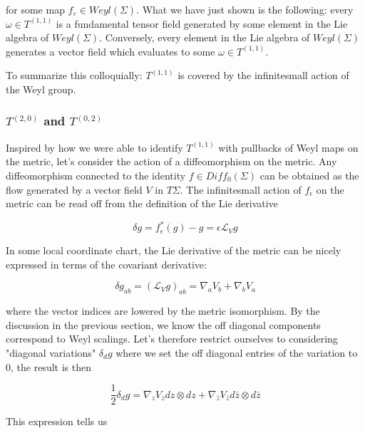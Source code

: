    for some map $f_\varepsilon \in Weyl(\Sigma)$. What we have just shown is the following: every $\omega \in T^{(1, 1)}$ is a fundamental tensor field generated by some element in the Lie algebra of $Weyl(\Sigma)$. Conversely, every element in the Lie algebra of $Weyl(\Sigma)$ generates a vector field which evaluates to some $\omega \in T^{(1, 1)}$.

    To summarize this colloquially: $T^{(1,1)}$ is covered by the infinitesmall action of the Weyl group.

\subsubsection{$T^{(2, 0)}$ and $T^{(0, 2)}$}

    Inspired by how we were able to identify $T^{(1,1)}$ with pullbacks of Weyl maps on the metric, let's consider the action of a diffeomorphism on the metric. Any diffeomorphism connected to the identity $f \in Diff_0(\Sigma)$ can be obtained as the flow generated by a vector field $V$ in $T\Sigma$. The infinitesmall action of $f_\epsilon$ on the metric can be read off from the definition of the Lie derivative

    \begin{equation}
        \delta g = f_\epsilon^*(g) - g = \epsilon \mathcal L_V g
    \end{equation}

    In some local coordinate chart, the Lie derivative of the metric can be nicely expressed in terms of the covariant derivative:

    \begin{equation}
        \delta g_{ab} = (\mathcal L_V g)_{ab} = \nabla_a V_b + \nabla_b V_a
    \end{equation}

    where the vector indices are lowered by the metric isomorphism. By the discussion in the previous section, we know the off diagonal components correspond to Weyl scalings. Let's therefore restrict ourselves to considering "diagonal variations" $\delta_d g$ where we set the off diagonal entries of the variation to $0$, the result is then

    \begin{equation}
        \label{eq:diagonal-variation}
        \frac{1}{2} \delta_d g =  \nabla_z V_z dz \otimes dz + \nabla_{\bar z} V_{\bar z} d\bar z \otimes d\bar z
    \end{equation}

    This expression tells us


